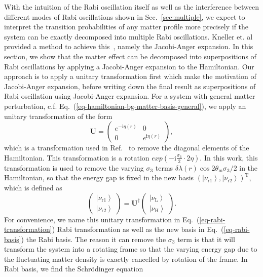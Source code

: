 \documentclass[%
reprint,
 amsmath,amssymb,
 prd,
]{revtex4-1}
\newcommand{\ket}[1]{\left| #1\right\rangle}
\newcommand{\ri}{\mathrm{i}}
\begin{document}
With the intuition of the Rabi oscillation itself as well as the interference between different modes of Rabi oscillations shown in Sec.~\ref{sec:multiple}, we expect to interpret the transition probabilities of any matter profile more precisely if the system can be exactly decomposed into multiple Rabi oscillations. Kneller et. al provided a method to achieve this~\cite{Kneller2013}, namely the Jacobi-Anger expansion. In this section, we show that the matter effect can be decomposed into superpositions of Rabi oscillations by applying a Jacobi-Anger expansion to the Hamiltonian. Our approach is to apply a unitary transformation first which make the motivation of Jacobi-Anger expansion, before writing down the final result as superpositions of Rabi oscillation using Jacobi-Anger expansion. For a system with general matter perturbation, c.f. Eq.~(\ref{eq-hamiltonian-bg-matter-basis-general}), we apply an unitary transformation of the form
\begin{equation}
    \mathbf{U} =  \begin{pmatrix} e^{-\ri \eta (r)} & 0 \\  0 & e^{\mathrm i \eta (r)}  \end{pmatrix},
    \label{eq-rabi-transformation}
\end{equation}
which is a transformation used in Ref.~ to remove the diagonal elements of the Hamiltonian. This transformation is a rotation $exp\left(-\mathrm i\frac{\sigma_3}{2}\cdot 2\eta\right)$. In this work, this transformation is used to remove the varying $\sigma_3$ terms $\delta\lambda(r) \cos 2\theta_{\mathrm m} \sigma_3/2$ in the Hamiltonian, so that the energy gap is fixed in the new basis $\left(\ket{\nu_{\mathrm{r1}}},\ket{\nu_{\mathrm{r2}}}\right)^{\mathrm{T}}$, which is defined as
\begin{equation}
    \begin{pmatrix} \ket{\nu_{\mathrm{r1}}}\\ \ket{\nu_{\mathrm{r2}}} \end{pmatrix} =  \mathbf{U}^\dagger \begin{pmatrix} \ket{\nu_{\mathrm{L}}} \\ \ket{\nu_{\mathrm{H}}} \end{pmatrix}.
    \label{eq-rabi-basis}
\end{equation}
For convenience, we name this unitary transformation in Eq.~(\ref{eq-rabi-transformation}) Rabi transformation as well as the new basis in Eq.~(\ref{eq-rabi-basis}) the Rabi basis. The reason it can remove the $\sigma_3$ term is that it will transform the system into a rotating frame so that the varying energy gap due to the fluctuating matter density is exactly cancelled by rotation of the frame. In Rabi basis, we find the Schr\"{o}dinger equation
\end{document}
